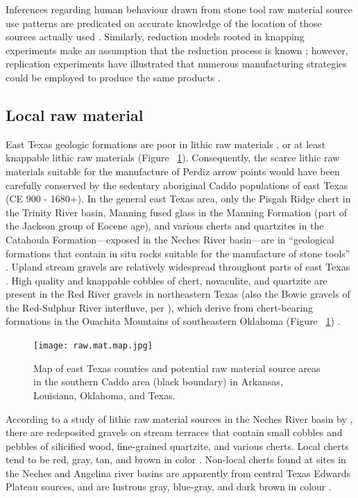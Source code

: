 \documentclass[review]{elsarticle}
\begin{document}
Inferences regarding human behaviour drawn from stone tool raw material source use patterns are predicated on accurate knowledge of the location of those sources actually used \citep[365]{RN5787}. Similarly, reduction models rooted in knapping experiments make an assumption that the reduction process is known \citep{RN6855}; however, replication experiments have illustrated that numerous manufacturing strategies could be employed to produce the same products \citep{RN8968,RN8969}.

\subsection*{Local raw material}

East Texas geologic formations are poor in lithic raw materials \citep[Figure 2.1]{RN439}, or at least knappable lithic raw materials (Figure ~\ref{fig:raw.map}). Consequently, the scarce lithic raw materials suitable for the manufacture of Perdiz arrow points would have been carefully conserved by the sedentary aboriginal Caddo populations of east Texas (CE 900 - 1680+). In the general east Texas area, only the Pisgah Ridge chert in the Trinity River basin, Manning fused glass in the Manning Formation (part of the Jackson group of Eocene age), and various cherts and quartzites in the Catahoula Formation---exposed in the Neches River basin---are in “geological formations that contain in situ rocks suitable for the manufacture of stone tools” \citep[49]{RN439}. Upland stream gravels are relatively widespread throughout parts of east Texas \citep[56-57]{RN439}. High quality and knappable cobbles of chert, novaculite, and quartzite are present in the Red River gravels in northeastern Texas (also the Bowie gravels of the Red-Sulphur River interfluve, per \citet{RN846}), which derive from chert-bearing formations in the Ouachita Mountains of southeastern Oklahoma (Figure ~\ref{fig:raw.map}) \citep[Figure 1.20]{RN439}.

\begin{figure}[!htbp]\centering
\texttt{[image: raw.mat.map.jpg]}
\caption{Map of east Texas counties and potential raw material source areas in the southern Caddo area (black boundary) in Arkansas, Louisiana, Oklahoma, and Texas.}
\label{fig:raw.map}
\end{figure}

According to a study of lithic raw material sources in the Neches River basin by \citet[69]{RN1253}, there are redeposited gravels on stream terraces that contain small cobbles and pebbles of silicified wood, fine-grained quartzite, and various cherts. Local cherts tend to be red, gray, tan, and brown in color \cite[66]{RN1253}. Non-local cherts found at sites in the Neches and Angelina river basins are apparently from central Texas Edwards Plateau sources, and are lustrous gray, blue-gray, and dark brown in colour \citep{RN1253}.
\end{document}
